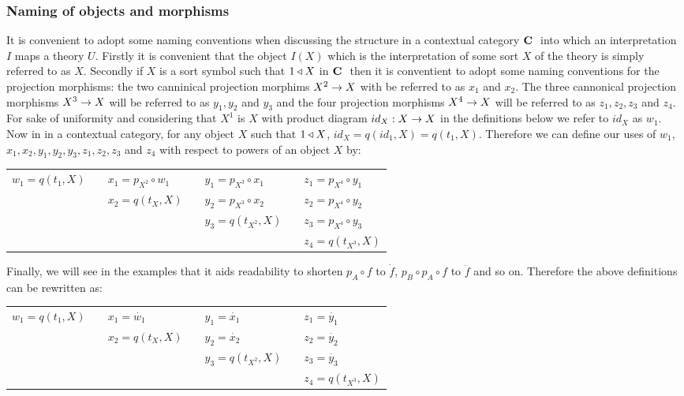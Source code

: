 \subsubsection{Naming of objects and morphisms}
\label{projectionnaming}
It is convenient to adopt some naming conventions when discussing the structure in a contextual category $\textbf{C}\ $ into which an interpretation $I$ maps a theory $U$. Firstly it is convenient that the object $I(X)$ which is the interpretation of some sort $X$ of the theory is simply referred to as $X$.
Secondly if $X$ is a sort symbol such that $1 \triangleleft X$ in $\textbf{C}\ $ then it is conventient to adopt some naming conventions for
the projection morphisms: the two canninical projection morphims $X^2 \rightarrow X$ with be referred to as $x_1$ and $x_2$. The three cannonical projection morphisms $X^3 \rightarrow X$ will be referred to as $y_1, y_2$ and $y_3$ and the four projection morphisms $X^4 \rightarrow X$ will be referred to as 
$z_1, z_2, z_3$ and $z_4$. For sake of  uniformity  and considering that  $X^1$ is $X$ with product diagram  $id_X: X \rightarrow X$  in the definitions
below we refer to $id_X$ as $w_1$.
Now in
in a contextual category, for any object $X$ such that $1 \triangleleft X$, $id_X = q(id_1,X) = q(t_1,X)$. Therefore we can define our uses of
$w_1$, $x_1,x_2,y_1,y_2,y_3,z_1,z_2,z_3$ and $z_4$ with respect to powers of an object $X$ by: \\
\begin{tabular} {l p{1cm} l p{1cm} l p{1cm} l}
$w_1 = q(t_1,X)$ &&  $x_1 = p_{X^2} \circ w_1$ && $y_1 = p_{X^3} \circ x_1$  && $z_1 = p_{X^4} \circ y_1$ \\
                 &&  $x_2 = q(t_X,X)$          && $y_2 = p_{X^3} \circ x_2$  && $z_2 = p_{X^4} \circ y_2$ \\
                 &&                            && $y_3 = q(t_{X^2},X)$       && $z_3 = p_{X^4} \circ y_3$ \\
                 &&                            &&                            && $z_4 = q(t_{X^3},X)$
\end{tabular}


Finally, we will see in the examples that it aids  readability to shorten  $p_A \circ f$ to $\dot{f}$, $p_B \circ p_A \circ f$ to $\ddot{f}$ and so on.
Therefore the above definitions can be rewritten as: \\
\begin{tabular} {l p{1cm} l p{1cm} l p{1cm} l}
$w_1 = q(t_1,X)$ &&  $x_1 = \dot{w_1}$ && $y_1 = \dot{x_1}$  && $z_1 = \dot{y_1}$ \\
                 &&  $x_2 = q(t_X,X)$          && $y_2 = \dot{x_2}$  && $z_2 = \dot{y_2}$ \\
                 &&                            && $y_3 = q(t_{X^2},X)$       && $z_3 = \dot{y_3}$ \\
                 &&                            &&                            && $z_4 = q(t_{X^3},X)$
\end{tabular}













 
  